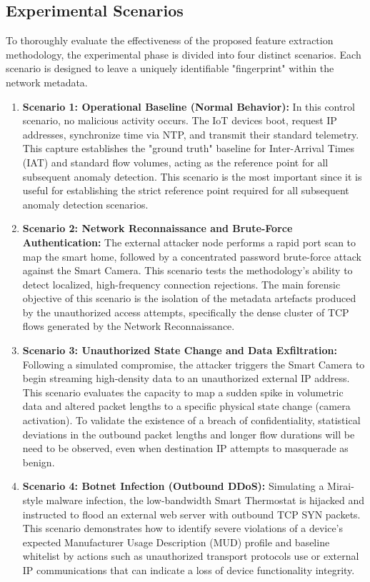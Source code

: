 \subsection{Experimental Scenarios}

To thoroughly evaluate the effectiveness of the proposed feature extraction methodology, the experimental phase is divided into four distinct scenarios. Each scenario is designed to leave a uniquely identifiable "fingerprint" within the network metadata.

\begin{enumerate}
	\item \textbf{Scenario 1: Operational Baseline (Normal Behavior):} In this control scenario, no malicious activity occurs. The IoT devices boot, request IP addresses, synchronize time via NTP, and transmit their standard telemetry. This capture establishes the "ground truth" baseline for Inter-Arrival Times (IAT) and standard flow volumes, acting as the reference point for all subsequent anomaly detection. This scenario is the most important since it is useful for establishing the strict reference point required for all subsequent anomaly detection scenarios.
	
	\item \textbf{Scenario 2: Network Reconnaissance and Brute-Force Authentication:} The external attacker node performs a rapid port scan to map the smart home, followed by a concentrated password brute-force attack against the Smart Camera. This scenario tests the methodology's ability to detect localized, high-frequency connection rejections. The main forensic objective of this scenario is the isolation of the metadata artefacts produced by the unauthorized access attempts, specifically the dense cluster of TCP flows generated by the Network Reconnaissance. 
	
	\item \textbf{Scenario 3: Unauthorized State Change and Data Exfiltration:} Following a simulated compromise, the attacker triggers the Smart Camera to begin streaming high-density data to an unauthorized external IP address. This scenario evaluates the capacity to map a sudden spike in volumetric data and altered packet lengths to a specific physical state change (camera activation). To validate the existence of a breach of confidentiality, statistical deviations in the outbound packet lengths and longer flow durations will be need to be observed, even when destination IP attempts to masquerade as benign. 
	
	\item \textbf{Scenario 4: Botnet Infection (Outbound DDoS):} Simulating a Mirai-style malware infection, the low-bandwidth Smart Thermostat is hijacked and instructed to flood an external web server with outbound TCP SYN packets. This scenario demonstrates how to identify severe violations of a device's expected Manufacturer Usage Description (MUD) profile and baseline whitelist by actions such as unauthorized transport protocols use or external IP communications that can indicate a loss of device functionality integrity.
\end{enumerate}

